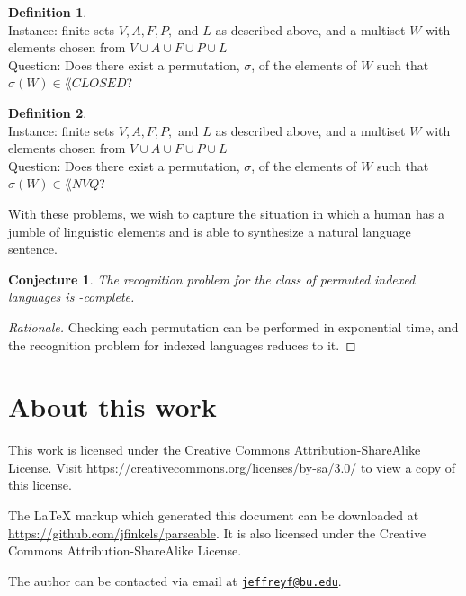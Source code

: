 \documentclass[draft]{article}
\newtheorem{conjecture}{Conjecture}
\newenvironment{rationale}{\begin{proof}[Rationale]}{\end{proof}}
\theoremstyle{remark} \newtheorem{technicality}{Technical note}
\theoremstyle{definition} \newtheorem{definition}{Definition}
\newcommand{\email}[1]{\href{mailto:#1}{\nolinkurl{#1}}} %
\newenvironment{langdef}[1]{\begin{definition}{\lang{#1}}}{\end{definition}}
\newenvironment{instance}{\\Instance:}{}
\newenvironment{question}{\\Question:}{}
\newcommand{\pc}{PERM\mbox{-}CLOSED}
\newcommand{\pn}{PERM\mbox{-}NVQ}
\begin{document}
\begin{langdef}{\pc}
  \begin{instance}
    finite sets $V, A, F, P,$ and $L$ as described above, and a multiset $W$ with elements chosen from $V\cup A\cup F\cup P\cup L$
  \end{instance}
  \begin{question}
    Does there exist a permutation, $\sigma$, of the elements of $W$ such that $\sigma(W)\in\lang{CLOSED}$?
  \end{question}
\end{langdef}

\begin{langdef}{\pn}
  \begin{instance}
    finite sets $V, A, F, P,$ and $L$ as described above, and a multiset $W$ with elements chosen from $V\cup A\cup F\cup P\cup L$
  \end{instance}
  \begin{question}
    Does there exist a permutation, $\sigma$, of the elements of $W$ such that $\sigma(W)\in\lang{NVQ}$?
  \end{question}
\end{langdef}

With these problems, we wish to capture the situation in which a human has a jumble of linguistic elements and is able to synthesize a natural language sentence.

\begin{conjecture}
  The recognition problem for the class of permuted indexed languages is \EXP-complete.
\end{conjecture}
\begin{rationale}
  Checking each permutation can be performed in exponential time, and the recognition problem for indexed languages reduces to it.
\end{rationale}

\section{About this work}

This work is licensed under the Creative Commons Attribution-ShareAlike License.
Visit \mbox{\url{https://creativecommons.org/licenses/by-sa/3.0/}} to view a copy of this license.

The \LaTeX{} markup which generated this document can be downloaded at \mbox{\url{https://github.com/jfinkels/parseable}}.
It is also licensed under the Creative Commons Attribution-ShareAlike License.

The author can be contacted via email at \email{jeffreyf@bu.edu}.



\end{document}
